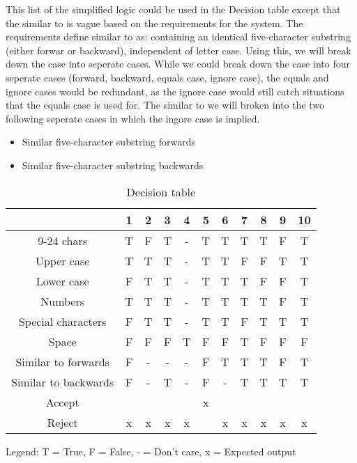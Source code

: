 \documentclass[12pt,letterpaper]{article}
\begin{document}
This list of the simplified logic could be used in the Decision table except that the similar to is vague based on the
requirements for the system. The requirements define similar to as: containing an identical five-character
substring (either forwar or backward), independent of letter case.
Using this, we will break down the case into seperate cases. While we could break down the case into
four seperate cases (forward, backward, equals case, ignore case), the equals and
ignore cases would be redundant, as the ignore case would still catch situations that the equals
case is used for. The similar to we will broken into the two following seperate cases in which the ingore case is implied.
\begin{itemize}
\item Similar five-character substring forwards
\item Similar five-character substring backwards
\end{itemize}

\begin{table}[h]
  \begin{center}
    \caption{Decision table}
    \label{tab:Main table}
    
    \begin{tabular}{c|c|c|c|c|c|c|c|c|c|c|}
    & 1 & 2 & 3 & 4 & 5 & 6 & 7 & 8 & 9 & 10 \\
    \hline
    9-24 chars & T & F & T & - & T & T & T & T & F & T \\
    \hline
    Upper case & T & T & T & - & T & T & F & F & T & T \\
    \hline
    Lower case & F & T & T & - & T & T & T & F & F & T \\
    \hline
    Numbers & T & T & T & - & T & T & T & T & F & T \\
    \hline
    Special characters & F & T & T & - & T & T & F & T & T & T \\
    \hline
    Space & F & F & F & T & F & F & T & F & F & F \\
    \hline 
    Similar to forwards & F & - & - & - & F & T & T & T & F & T \\
    \hline
    Similar to backwards & F & - & T & - & F & - & T & T & T & T \\
    \midrule
    Accept & & & & & x & & & & & \\
    \hline
    Reject & x & x & x & x & & x & x & x & x & x \\
    \end{tabular}
    
    Legend: T = True, F = False, - = Don't care, x = Expected output
  \end{center}
\end{table}
\end{document}
